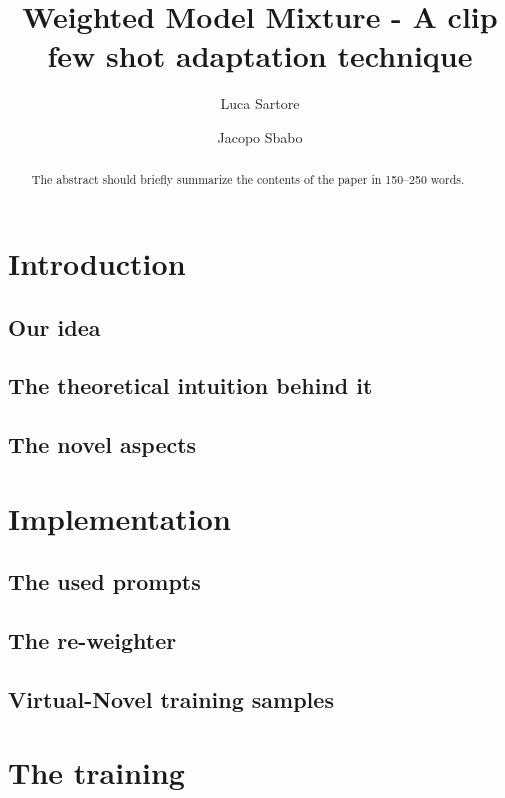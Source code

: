 \documentclass[runningheads]{llncs}
\begin{document}
%
\title{Weighted Model Mixture - A clip few shot adaptation technique}
%
\author{
    Luca Sartore
    \and
    Jacopo Sbabo
}
    
%
\maketitle              %
%

\begin{abstract}
The abstract should briefly summarize the contents of the paper in
150--250 words.

\end{abstract}
\section{Introduction}

\subsection{Our idea}
\subsection{The theoretical intuition behind it}
\subsection{The novel aspects}

\section{Implementation}

\subsection{The used prompts}

\subsection{The re-weighter}

\subsection{Virtual-Novel training samples}

\section{The training}
\end{document}
